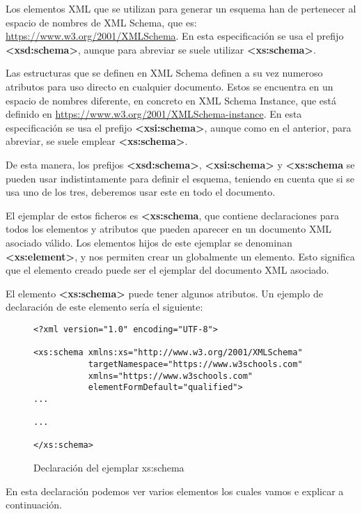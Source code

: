 Los elementos XML que se utilizan para generar un esquema han de pertenecer al espacio de nombres de XML Schema, que es: \url{https://www.w3.org/2001/XMLSchema}. En esta especificación se usa el prefijo \textbf{<xsd:schema>}, aunque para abreviar se suele utilizar \textbf{<xs:schema>}.

Las estructuras que se definen en XML Schema definen a su vez numeroso atributos para uso directo en cualquier documento. Estos se encuentra en un espacio de nombres diferente, en concreto en XML Schema Instance, que está definido en \url{https://www.w3.org/2001/XMLSchema-instance}. En esta especificación se usa el prefijo \textbf{<xsi:schema>}, aunque como en el anterior, para abreviar, se suele emplear \textbf{<xs:schema>}.

De esta manera, los prefijos \textbf{<xsd:schema>}, \textbf{<xsi:schema>} y \textbf{<xs:schema} se pueden usar indistintamente para definir el esquema, teniendo en cuenta que si se usa uno de los tres, deberemos usar este en todo el documento.

El ejemplar de estos ficheros es \textbf{<xs:schema}, que contiene declaraciones para todos los elementos y atributos que pueden aparecer en un documento XML asociado válido. Los elementos hijos de este ejemplar se denominan \textbf{<xs:element>}, y nos permiten crear un globalmente un elemento. Esto significa que el elemento creado puede ser el ejemplar del documento XML asociado.

El elemento \textbf{<xs:schema>} puede tener algunos atributos. Un ejemplo de declaración de este elemento sería el siguiente:

\begin{figure}[H]
    \begin{tcolorbox}[sharp corners, colback=yellow!30, colframe=white!20]
        \scriptsize
        \begin{verbatim}
<?xml version="1.0" encoding="UTF-8">

<xs:schema xmlns:xs="http://www.w3.org/2001/XMLSchema"
           targetNamespace="https://www.w3schools.com"
           xmlns="https://www.w3schools.com"
           elementFormDefault="qualified">
...

...

</xs:schema>
        \end{verbatim}
    \end{tcolorbox}
    \caption{Declaración del ejemplar xs:schema}
\end{figure}

En esta declaración podemos ver varios elementos los cuales vamos e explicar a continuación.

